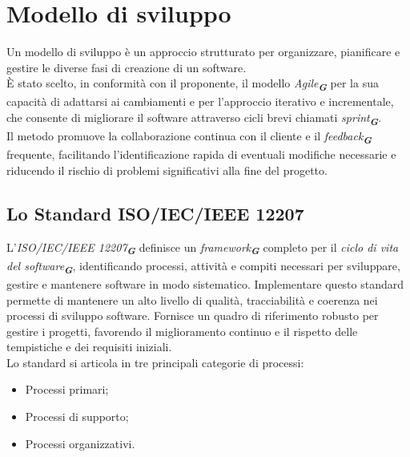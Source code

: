 
\section{Modello di sviluppo}
\label{sec:modello_sviluppo}
Un modello di sviluppo è un approccio strutturato per organizzare, pianificare e gestire le diverse fasi di creazione di un software.\\
È stato scelto, in conformità con il proponente, il modello \emph{Agile}\textsubscript{\textit{\textbf{G}}} per la sua capacità di adattarsi ai cambiamenti e per l’approccio iterativo e incrementale, che consente di migliorare il software attraverso cicli brevi chiamati \emph{sprint}\textsubscript{\textit{\textbf{G}}}.\\
Il metodo promuove la collaborazione continua con il cliente e il \emph{feedback}\textsubscript{\textit{\textbf{G}}} frequente, facilitando l’identificazione rapida di eventuali modifiche necessarie e riducendo il rischio di problemi significativi alla fine del progetto.\\

\subsection{Lo Standard ISO/IEC/IEEE 12207}
L'\emph{ISO/IEC/IEEE 12207}\textsubscript{\textit{\textbf{G}}} definisce un \emph{framework}\textsubscript{\textit{\textbf{G}}} completo per il \emph{ciclo di vita del software}\textsubscript{\textit{\textbf{G}}}, identificando processi, attività e compiti necessari per sviluppare, gestire e mantenere software in modo sistematico. Implementare questo standard permette di mantenere un alto livello di qualità, tracciabilità e coerenza nei processi di sviluppo software. Fornisce un quadro di riferimento robusto per gestire i progetti, favorendo il miglioramento continuo e il rispetto delle tempistiche e dei requisiti iniziali.\\
Lo standard si articola in tre principali categorie di processi:
\begin{itemize}
    \item Processi primari;
    \item Processi di supporto;
    \item Processi organizzativi.
\end{itemize}

